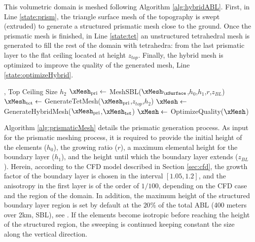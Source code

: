 \documentclass[1p]{elsarticle}
\begin{document}
This volumetric domain is meshed following Algorithm \ref{alg:hybridABL}. First, in Line \ref{state:prism}, the triangle surface mesh of the topography is swept (extruded) to generate a structured prismatic mesh close to the ground.  
Once the prismatic mesh is finished, in Line \ref{state:tet}
an unstructured tetrahedral mesh is generated to fill the rest of the domain with tetrahedra: from the last prismatic layer to the flat ceiling located at height $z_{top}$.
Finally, the hybrid mesh is optimized to improve the quality of the generated mesh, Line \ref{state:optimizeHybrid}.

\begin{algorithm}[t!]
	\caption{Generation of the volumetric hybrid ABL mesh}
	\label{alg:hybridABL}
	\begin{algorithmic}[1]
		\renewcommand{\algorithmicrequire}{\textbf{Input:}}
		\renewcommand{\algorithmicensure}{\textbf{Output:}}
		, Top Ceiling Size $h_{2}$
		\State $\xMesh_{\mathrm{pri}}\gets$ {MeshSBL}({$\xMesh_\xSurface$},$h_{0}$,$h_{1}$,$r$,$z_{BL}$)
		\label{state:prism}
		\State $\xMesh_{\mathrm{tet}}\gets$ GenerateTetMesh($\xMesh_{\mathrm{pri}}$,$z_{top}$,$h_{2}$)
		\label{state:tet}
		\State $\xMesh\gets$ GenerateHybridMesh($\xMesh_{\mathrm{pri}}$,$\xMesh_{\mathrm{tet}}$)
		\label{state:hybrid}
		\State $\xMesh\gets$ OptimizeQuality($\xMesh$)
		\label{state:optimizeHybrid}
		\EndFunction
	\end{algorithmic}
\end{algorithm}

Algorithm \ref{alg:prismaticMesh} details the prismatic generation process.
As input for the prismatic meshing process, it is required to provide the initial height of the elements ($h_{0}$), the growing ratio ($r$),  a maximum elemental height for the boundary layer ($h_{1}$), and the height until which the boundary layer extends ($z_{BL}$).
Herein, according to the CFD model described in Section \ref{sec:cfd}, the growth factor of the boundary layer is chosen in the interval $[1.05,1.2]$, and the anisotropy in the first layer is of the order of $1/100$, depending on the CFD case and the region of the domain.
In addition, the maximum height of the structured boundary layer region is set by default at the $20\%$ of the total ABL (400 meters over 2km, SBL), see \cite{kopp1984remote,garratt1994atmospheric,blocken2007cfd,wizelius2007developing,stull2012introduction}. If the elements become isotropic before reaching the height of the structured region, the sweeping is continued 
keeping constant the size along the vertical direction.
\end{document}
